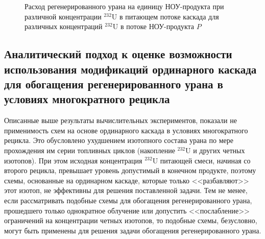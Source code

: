 \begin{figure}[ht]
  \caption{Расход регенерированного урана на единицу НОУ-продукта при различной концентрации $^{232}$U в питающем потоке каскада для различных концентраций $^{232}$U в потоке НОУ-продукта $P$}\label{sc3_1.second}
\end{figure}


\subsection{Аналитический подход к оценке возможности использования модификаций ординарного каскада для обогащения регенерированного урана в условиях многократного рецикла}

Описанные выше результаты вычислительных экспериментов, показали не применимость схем на основе ординарного каскада в условиях  многократного рецикла. Это обусловлено ухудшением изотопного состава урана по мере прохождения им серии топливных циклов (накопление $^{232}$U и других четных изотопов). При этом исходная концентрация $^{232}$U питающей смеси, начиная со второго рецикла, превышает уровень допустимый в конечном продукте, поэтому схемы, основанные на ординарном каскаде, которые только <<разбавляют>> этот изотоп, не эффективны для решения поставленной задачи. Тем не менее, если рассматривать подобные схемы для обогащения регенерированного урана, прошедшего только однократное облучение или допустить <<послабление>> ограничений на концентрации четных изотопов, то подобные схемы, безусловно, могут быть применены для решения задачи обогащения регенерированного урана.

